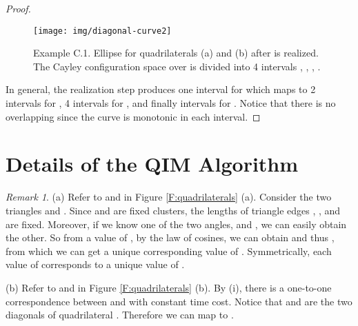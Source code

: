 \documentclass[secthm,amsthm,english]{article}
\theoremstyle{definition}
\theoremstyle{remark}
\newtheorem{remark}{Remark}
\begin{document}
\begin{proof}
\begin{figure}[h]
	  
	 
	
	 
	 
	
	\begin{centering}
	\texttt{[image: img/diagonal-curve2]} 
	\par\end{centering}
	
	\caption{Example C.1. Ellipse  for quadrilaterals (a) 
	and (b)  after  is realized. 
	The Cayley configuration space over  is divided into 4 intervals ,
	, , . }

\label{F:diagonal-curve-2} 
\end{figure}


In general, the  realization step   produces one interval for 
which maps to 2 intervals for , 4 intervals for , and finally
 intervals for . 
Notice that there is no overlapping since 
the curve is monotonic in each interval.
\end{proof}









\section{Details of the QIM Algorithm}
\label{app:qim}

\begin{remark}
\label{rmk:qim}
(a) Refer to  and  in Figure \ref{F:quadrilaterals} (a). 
Consider the two triangles  and . 
Since  and  are fixed clusters, the lengths of triangle edges , ,  and  are fixed. 
Moreover, if we know one of the two angles,  and , we can easily obtain the other. 
So from a value of , by the law of cosines, we can obtain  and thus , from which we can get a unique corresponding value of . Symmetrically, each value of  corresponds to a unique value of . 


\noindent(b) Refer to  and  in Figure \ref{F:quadrilaterals} (b). 
By (i), there is a one-to-one correspondence between  and  with constant time cost. 
Notice that  and  are the two diagonals of quadrilateral . 
Therefore we can map to . 
\end{remark}
\end{document}
